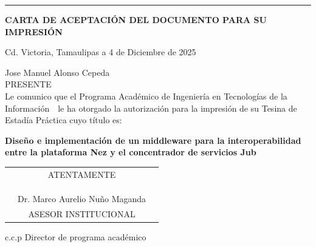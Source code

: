 \documentclass[12pt]{article}
\newcommand{\HRule}{\rule{\linewidth}{0.25mm}}
\newcommand{\ncarrera}            {Ingeniería en Tecnologías de la Información}
\newcommand{\nasesorinstitucional}{Dr. Marco Aurelio Nuño Maganda}
\newcommand{\NombreAlumno}{Jose Manuel Alonso Cepeda}
\newcommand{\NombreProyecto}{Diseño e implementación de un middleware para la interoperabilidad entre la plataforma Nez y el concentrador de servicios Jub}
\newcommand{\fechacarta}{4 de Diciembre de 2025}
\newcommand{\separacionCorta}{0.0cm}
\newcommand{\separacionLarga}{0.5cm}
\begin{document}
\HRule 



\clearpage
\thispagestyle{fancy}
\setcounter{page}{1}


\clearpage
\thispagestyle{fancy}


\clearpage
\thispagestyle{fancy}


\clearpage
{}
\thispagestyle{empty}

\vspace*{1.5cm}
\large

\begin{center}
\textbf{CARTA DE ACEPTACIÓN DEL DOCUMENTO PARA SU IMPRESIÓN}\\[\separacionLarga]
\end{center}

\begin{flushright}
Cd. Victoria, Tamaulipas a \fechacarta \\[\separacionLarga]
\end{flushright}

\parindent=0mm

\NombreAlumno \\
PRESENTE \\[\separacionCorta]

Le comunico que  el Programa Académico de \ncarrera\ \ le ha otorgado la autorización para la impresión de su Tesina de Estadía Práctica cuyo título es: \\[\separacionCorta]

\begin{center}
\textbf{\NombreProyecto} \\[\separacionLarga]
\end{center}

\begin{center}	
\begin{tabular}{ccc}
\centering
& ATENTAMENTE & \\ 
& & \\
& & \\
& & \\ \hline
& \nasesorinstitucional & \\
& ASESOR INSTITUCIONAL & \\
\end{tabular}
\end{center} 
\vspace{2cm}
c.c.p Director de programa académico
\end{document}
